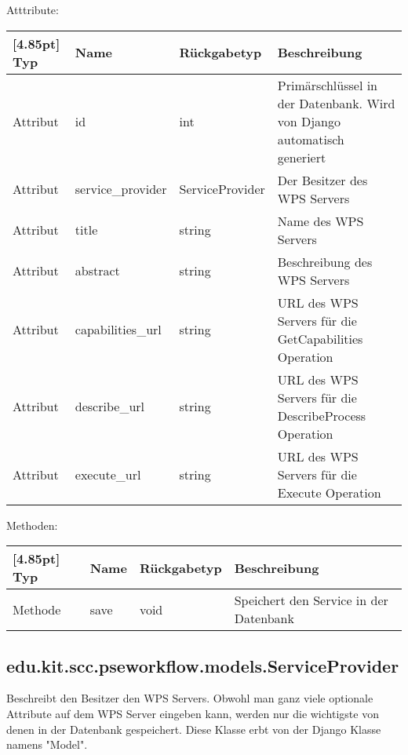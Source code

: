 			Atttribute:
			\begin{center}
				\setlength\tabcolsep{5pt}
				\renewcommand{\arraystretch}{1.5}
				
				\begin{tabularx}{\textwidth}{|l|l|l|X|}
					\hline
					\rowcolor[gray]{0.75}[4.85pt]
					Typ & Name & Rückgabetyp & Beschreibung \\ \hline 
					Attribut & id & int & Primärschlüssel in der Datenbank. Wird von Django automatisch generiert \\ \hline
					Attribut & service\_provider & ServiceProvider & Der Besitzer des WPS Servers \\ \hline
					Attribut & title & string & Name des WPS Servers \\ \hline
					Attribut & abstract & string & Beschreibung des WPS Servers \\ \hline
					Attribut & capabilities\_url & string & URL des WPS Servers für die GetCapabilities Operation \\ \hline
					Attribut & describe\_url & string & URL des WPS Servers für die DescribeProcess Operation \\ \hline
					Attribut & execute\_url & string & URL des WPS Servers für die Execute Operation \\ \hline
					
				\end{tabularx}
			\end{center}
			
			Methoden:
			\begin{center}
				\setlength\tabcolsep{5pt}
				\renewcommand{\arraystretch}{1.5}
				
				\begin{tabularx}{\textwidth}{|l|l|l|X|}
					\hline
					\rowcolor[gray]{0.75}[4.85pt]
					Typ & Name & Rückgabetyp & Beschreibung \\ \hline 
					Methode & save & void & Speichert den Service in der Datenbank \\
					\hline
				\end{tabularx}
			\end{center}

        \subsection{edu.kit.scc.pseworkflow.models.ServiceProvider}
			Beschreibt den Besitzer den WPS Servers. Obwohl man ganz viele optionale Attribute auf dem WPS Server eingeben kann, werden nur die wichtigste von denen in der Datenbank gespeichert. \newline
			Diese Klasse erbt von der Django Klasse namens "Model".
			
